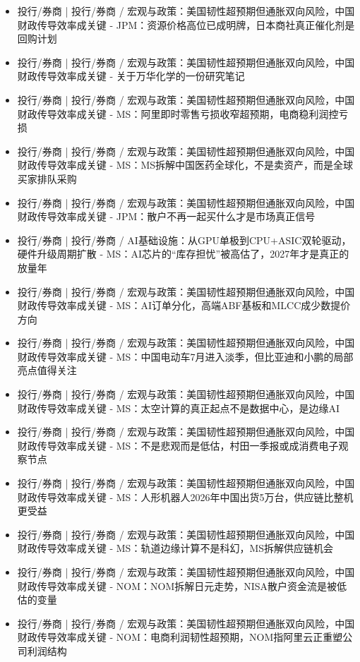 \documentclass[11pt]{ctexart}
\begin{document}
\begin{itemize}
  \item [R027] 投行/券商 | 投行/券商 / 宏观与政策：美国韧性超预期但通胀双向风险，中国财政传导效率成关键 - JPM：资源价格高位已成明牌，日本商社真正催化剂是回购计划
  \item [R028] 投行/券商 | 投行/券商 / 宏观与政策：美国韧性超预期但通胀双向风险，中国财政传导效率成关键 - 关于万华化学的一份研究笔记
  \item [R029] 投行/券商 | 投行/券商 / 宏观与政策：美国韧性超预期但通胀双向风险，中国财政传导效率成关键 - MS：阿里即时零售亏损收窄超预期，电商稳利润控亏损
  \item [R030] 投行/券商 | 投行/券商 / 宏观与政策：美国韧性超预期但通胀双向风险，中国财政传导效率成关键 - MS：MS拆解中国医药全球化，不是卖资产，而是全球买家排队采购
  \item [R031] 投行/券商 | 投行/券商 / 宏观与政策：美国韧性超预期但通胀双向风险，中国财政传导效率成关键 - JPM：散户不再一起买什么才是市场真正信号
  \item [R032] 投行/券商 | 投行/券商 / AI基础设施：从GPU单极到CPU+ASIC双轮驱动，硬件升级周期扩散 - MS：AI芯片的“库存担忧”被高估了，2027年才是真正的放量年
  \item [R033] 投行/券商 | 投行/券商 / 宏观与政策：美国韧性超预期但通胀双向风险，中国财政传导效率成关键 - MS：AI订单分化，高端ABF基板和MLCC成少数提价方向
  \item [R034] 投行/券商 | 投行/券商 / 宏观与政策：美国韧性超预期但通胀双向风险，中国财政传导效率成关键 - MS：中国电动车7月进入淡季，但比亚迪和小鹏的局部亮点值得关注
  \item [R035] 投行/券商 | 投行/券商 / 宏观与政策：美国韧性超预期但通胀双向风险，中国财政传导效率成关键 - MS：太空计算的真正起点不是数据中心，是边缘AI
  \item [R036] 投行/券商 | 投行/券商 / 宏观与政策：美国韧性超预期但通胀双向风险，中国财政传导效率成关键 - MS：不是悲观而是低估，村田一季报或成消费电子观察节点
  \item [R037] 投行/券商 | 投行/券商 / 宏观与政策：美国韧性超预期但通胀双向风险，中国财政传导效率成关键 - MS：人形机器人2026年中国出货5万台，供应链比整机更受益
  \item [R038] 投行/券商 | 投行/券商 / 宏观与政策：美国韧性超预期但通胀双向风险，中国财政传导效率成关键 - MS：轨道边缘计算不是科幻，MS拆解供应链机会
  \item [R039] 投行/券商 | 投行/券商 / 宏观与政策：美国韧性超预期但通胀双向风险，中国财政传导效率成关键 - NOM：NOM拆解日元走势，NISA散户资金流是被低估的变量
  \item [R040] 投行/券商 | 投行/券商 / 宏观与政策：美国韧性超预期但通胀双向风险，中国财政传导效率成关键 - NOM：电商利润韧性超预期，NOM指阿里云正重塑公司利润结构

\end{itemize}
\end{document}
